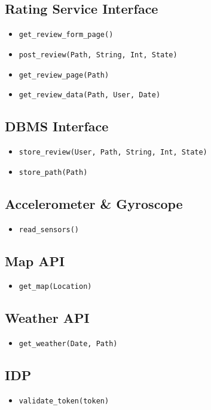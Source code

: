 \subsection{Rating Service Interface}
\begin{itemize}
    \item \texttt{get\_review\_form\_page()}
    \item \texttt{post\_review(Path, String, Int, State)}
    \item \texttt{get\_review\_page(Path)}
    \item \texttt{get\_review\_data(Path, User, Date)}
\end{itemize}

\subsection{DBMS Interface}
\begin{itemize}
    \item \texttt{store\_review(User, Path, String, Int, State)}
    \item \texttt{store\_path(Path)}
\end{itemize}

\subsection{Accelerometer \& Gyroscope}
\begin{itemize}
    \item \texttt{read\_sensors()}
\end{itemize}

\subsection{Map API}
\begin{itemize}
    \item \texttt{get\_map(Location)}
\end{itemize}

\subsection{Weather API}
\begin{itemize}
    \item \texttt{get\_weather(Date, Path)}
\end{itemize}

\subsection{IDP}
\begin{itemize}
    \item \texttt{validate\_token(token)}
\end{itemize}

